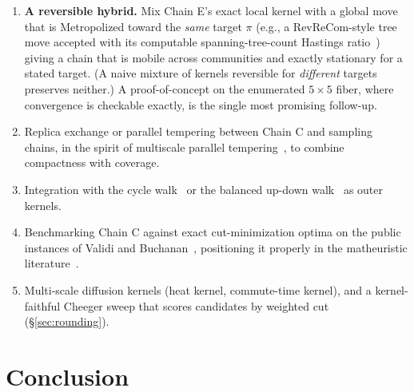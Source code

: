 \documentclass[11pt]{article}
\begin{document}
\begin{enumerate}
  \item \textbf{A reversible hybrid.} Mix Chain E's exact local
    kernel with a global move that is Metropolized toward the
    \emph{same} target $\pi$ (e.g., a RevReCom-style tree move
    accepted with its computable spanning-tree-count Hastings
    ratio~\cite{cannon2022spanning,autry2023metropolized}) giving a
    chain that is mobile across communities and exactly stationary for a
    stated target. (A naive mixture of kernels reversible for
    \emph{different} targets preserves neither.) A proof-of-concept on
    the enumerated $5 \times 5$ fiber, where convergence is checkable
    exactly, is the single most promising follow-up.
  \item Replica exchange or parallel tempering between Chain C and
    sampling chains, in the spirit of multiscale parallel
    tempering~\cite{chuang2025multiscale}, to combine compactness with
    coverage.
  \item Integration with the cycle walk~\cite{deford2025cycle} or the
    balanced up-down walk~\cite{akitaya2026bud} as outer kernels.
  \item Benchmarking Chain C against exact cut-minimization optima on
    the public instances of Validi and
    Buchanan~\cite{validi2022political}, positioning it properly in
    the matheuristic literature~\cite{brous2025recom}.
  \item Multi-scale diffusion kernels (heat kernel, commute-time
    kernel), and a kernel-faithful Cheeger sweep that scores
    candidates by weighted cut (\S\ref{sec:rounding}).
\end{enumerate}

\section{Conclusion}\label{sec:conclusion}
\end{document}

